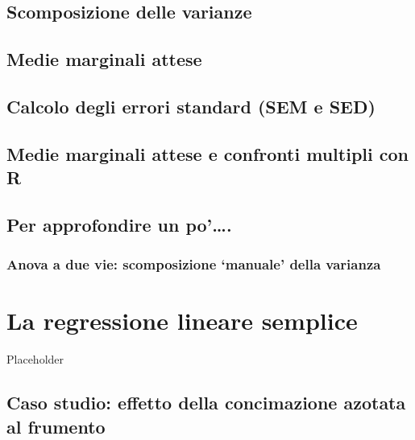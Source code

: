 \documentclass[a4paper,12pt,oneside]{book}
\begin{document}
\hypertarget{scomposizione-delle-varianze}{%
\section{Scomposizione delle varianze}\label{scomposizione-delle-varianze}}

\hypertarget{medie-marginali-attese-1}{%
\section{Medie marginali attese}\label{medie-marginali-attese-1}}

\hypertarget{calcolo-degli-errori-standard-sem-e-sed}{%
\section{Calcolo degli errori standard (SEM e SED)}\label{calcolo-degli-errori-standard-sem-e-sed}}

\hypertarget{medie-marginali-attese-e-confronti-multipli-con-r}{%
\section{Medie marginali attese e confronti multipli con R}\label{medie-marginali-attese-e-confronti-multipli-con-r}}

\hypertarget{per-approfondire-un-po.}{%
\section{Per approfondire un po'\ldots.}\label{per-approfondire-un-po.}}

\hypertarget{anova-a-due-vie-scomposizione-manuale-della-varianza}{%
\subsection{Anova a due vie: scomposizione `manuale' della varianza}\label{anova-a-due-vie-scomposizione-manuale-della-varianza}}

\hypertarget{la-regressione-lineare-semplice}{%
\chapter{La regressione lineare semplice}\label{la-regressione-lineare-semplice}}

Placeholder

\hypertarget{caso-studio-effetto-della-concimazione-azotata-al-frumento}{%
\section{Caso studio: effetto della concimazione azotata al frumento}\label{caso-studio-effetto-della-concimazione-azotata-al-frumento}}
\end{document}
